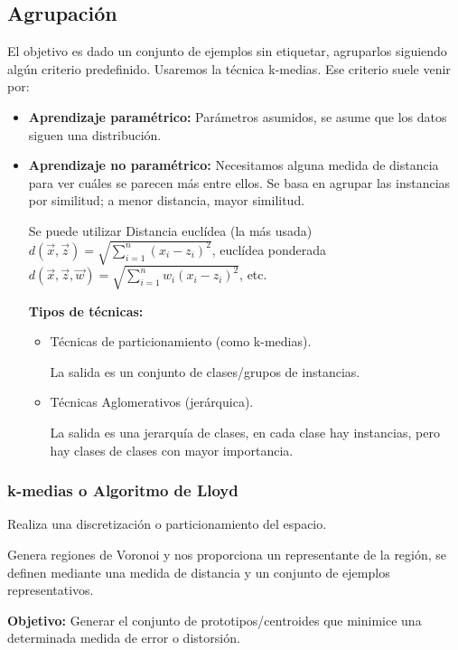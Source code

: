 \documentclass[12pt, twoside, openright]{report} %
\begin{document}
\subsection{Agrupación}
El objetivo es dado un conjunto de ejemplos sin etiquetar, agruparlos siguiendo algún criterio predefinido. Usaremos la técnica k-medias.
Ese criterio suele venir por:
\begin{itemize}
	\item \textbf{Aprendizaje paramétrico:} Parámetros asumidos, se asume que los datos siguen una distribución.
	\item \textbf{Aprendizaje no paramétrico:} Necesitamos alguna medida de distancia para ver cuáles se parecen más entre ellos. Se basa en agrupar las instancias por similitud; a menor distancia, mayor similitud.

	      Se puede utilizar Distancia euclídea (la más usada) $d\left( \vec{x},\vec{z}\right)   = \sqrt {\sum _{i=1}^{n}  \left( x_{i}-z_{i}\right)^2 }$, euclídea ponderada $d\left( \vec{x},\vec{z},\vec{w}\right)   = \sqrt {\sum _{i=1}^{n} w_i \left( x_{i}-z_{i}\right)^2 }$, etc.

	      \textbf{Tipos de técnicas:}
	      \begin{itemize}
		      \item Técnicas de particionamiento (como k-medias).

		            La salida es un conjunto de clases/grupos de instancias.
		      \item Técnicas Aglomerativos (jerárquica).

		            La salida es una jerarquía de clases, en cada clase hay instancias, pero hay clases de clases con mayor importancia.
	      \end{itemize}
\end{itemize}

\subsubsection{k-medias o Algoritmo de Lloyd}

Realiza una discretización o particionamiento del espacio.

Genera regiones de Voronoi y nos proporciona un representante de la región, se definen mediante una medida de distancia y un conjunto de ejemplos representativos.

\textbf{Objetivo:} Generar el conjunto de prototipos/centroides que minimice una determinada medida de error o distorsión.
\end{document}

